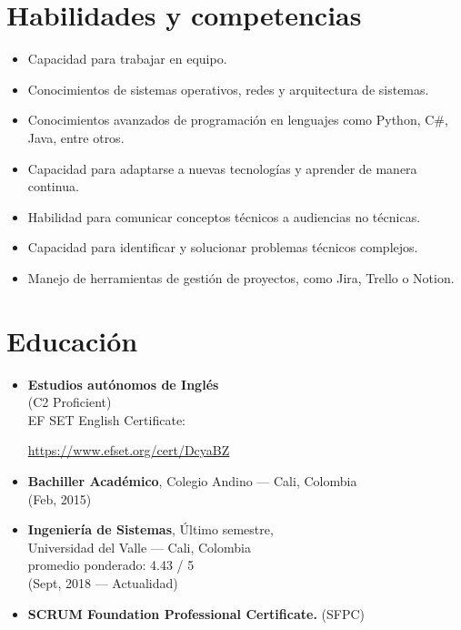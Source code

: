 \documentclass{article}
\begin{document}
\vspace{0.2cm}
\begin{multicols}{2}
  \begin{minipage}{0.46\textwidth}
    \section*{Habilidades y competencias}
    \begin{itemize}[leftmargin=*,itemsep=-1pt]
      \item Capacidad para trabajar en equipo.
      \item Conocimientos de sistemas operativos, redes y arquitectura de
            sistemas.
      \item Conocimientos avanzados de programación en lenguajes como
            Python,
            C\#, Java, entre otros.
      \item Capacidad para adaptarse a nuevas tecnologías y aprender de manera
            continua.
      \item Habilidad para comunicar conceptos técnicos a audiencias no
            técnicas.
      \item Capacidad para identificar y solucionar problemas técnicos
            complejos.
      \item Manejo de herramientas de gestión de proyectos, como Jira, Trello o
            Notion.
            \newline
    \end{itemize}
  \end{minipage}

  \begin{minipage}{0.45\textwidth}
    \section*{Educación}
    \begin{itemize}[leftmargin=*,itemsep=-1pt]
      \item \textbf{Estudios autónomos de Inglés} \\ (C2 Proficient) \\
            EF SET English
            Certificate:

            \href{https://www.efset.org/cert/DcyaBZ}{https://www.efset.org/cert/DcyaBZ}
      \item \textbf{Bachiller Académico}, Colegio Andino --- Cali, Colombia \\
            (Feb, 2015)
      \item \textbf{Ingeniería de Sistemas}, Último semestre, \\
            Universidad del
            Valle --- Cali, Colombia
            \\
            promedio ponderado: 4.43 / 5 \\
            (Sept, 2018 --- Actualidad)
      \item \textbf{SCRUM Foundation Professional
              Certificate.}
            (SFPC)


\end{itemize}
\end{minipage}
\end{multicols}
\end{document}
